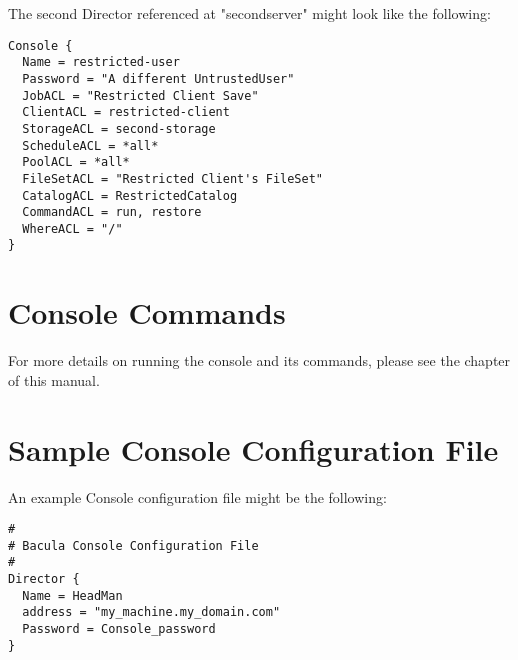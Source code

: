 The second Director referenced at "secondserver" might look
like the following:

\footnotesize
\begin{verbatim}
Console {
  Name = restricted-user
  Password = "A different UntrustedUser"
  JobACL = "Restricted Client Save"
  ClientACL = restricted-client
  StorageACL = second-storage
  ScheduleACL = *all*
  PoolACL = *all*
  FileSetACL = "Restricted Client's FileSet"
  CatalogACL = RestrictedCatalog
  CommandACL = run, restore
  WhereACL = "/"
}
\end{verbatim}
\normalsize



\section{Console Commands}

For more details on running the console and its commands, please see the 
 chapter of this manual. 

\section{Sample Console Configuration File}
\label{SampleConfiguration2}

An example Console configuration file might be the following: 

\footnotesize
\begin{verbatim}
#
# Bacula Console Configuration File
#
Director {
  Name = HeadMan
  address = "my_machine.my_domain.com"
  Password = Console_password
}
\end{verbatim}
\normalsize
